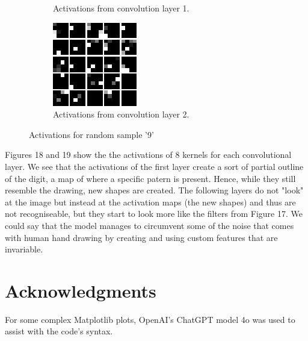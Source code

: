 \documentclass{article}
\begin{document}
\begin{figure}[h!]
\begin{subfigure}[t]{0.3\textwidth}
        \caption{Activations from convolution layer 1.}
        \label{fig:subfig19b}
    \end{subfigure}
    \hfill
    \begin{subfigure}[t]{0.3\textwidth}
        \centering
        \includegraphics[width=\textwidth]{./plots/activation9_2.png}
        \caption{Activations from convolution layer 2.}
        \label{fig:subfig19c}
    \end{subfigure}
    \caption{Activations for random sample '9'}
    \label{fig:plot19}
\end{figure}

Figures 18 and 19 show the the activations of 8 kernels for each convolutional layer.
We see that the activations of the first layer create a sort of partial outline of the digit, a map of where a specific patern is present.
Hence, while they still resemble the drawing, new shapes are created.
The following layers do not "look" at the image but instead at the activation maps (the new shapes) and thus are not recogniseable, but they start to look more like the filters from Figure 17.
We could say that the model manages to circumvent some of the noise that comes with human hand drawing by creating and using custom features that are invariable.

\section{Acknowledgments}
For some complex Matplotlib plots, OpenAI's ChatGPT model 4o was used to assist with the code's syntax.
\end{document}
